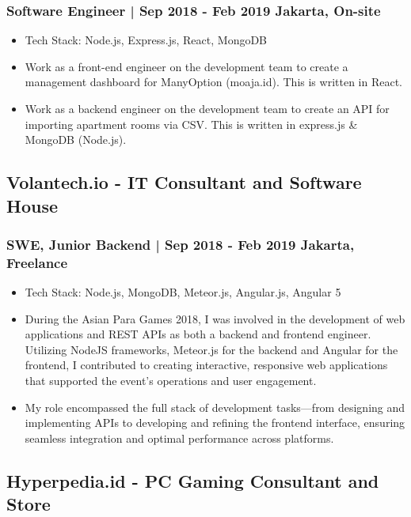 \documentclass[11pt]{article}
\begin{document}
\subsubsection{Software Engineer | Sep 2018 - Feb 2019 \hfill Jakarta, On-site}
\begin{itemize}
    \item Tech Stack: Node.js, Express.js, React, MongoDB
    \item Work as a front-end engineer on the development team to create a management dashboard for ManyOption (moaja.id). This is written in React.
    \item Work as a backend engineer on the development team to create an API for importing apartment rooms via CSV. This is written in express.js \& MongoDB (Node.js).
\end{itemize}

\subsection{Volantech.io - IT Consultant and Software House}
\subsubsection{SWE, Junior Backend | Sep 2018 - Feb 2019 \hfill Jakarta, Freelance}
\begin{itemize}
    \item Tech Stack: Node.js, MongoDB, Meteor.js, Angular.js, Angular 5
    \item During the Asian Para Games 2018, I was involved in the development of web applications and REST APIs as both a backend and frontend engineer. Utilizing NodeJS frameworks, Meteor.js for the backend and Angular for the frontend, I contributed to creating interactive, responsive web applications that supported the event's operations and user engagement.
    \item My role encompassed the full stack of development tasks—from designing and implementing APIs to developing and refining the frontend interface, ensuring seamless integration and optimal performance across platforms.
\end{itemize}

\subsection{Hyperpedia.id - PC Gaming Consultant and Store}
\end{document}
